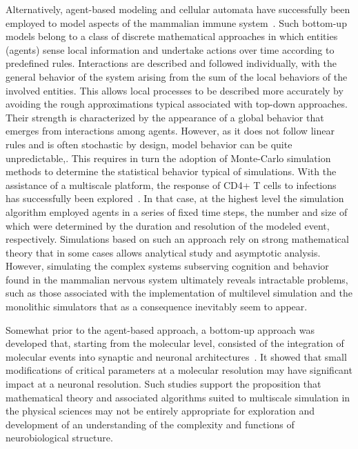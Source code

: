 \documentclass[11pt,3p,twocolumn]{JMN}
\begin{document}
Alternatively, agent-based modeling and cellular automata have successfully been employed to model aspects of the mammalian immune system~\citep{chiacchio14}. Such bottom-up models belong to a class of discrete mathematical approaches in which entities (agents) sense local information and undertake actions over time according to predefined rules. Interactions are described and followed individually, with the general behavior of the system arising from the sum of the local behaviors of the involved entities. This allows local processes to be described more accurately by avoiding the rough approximations typical associated with top-down approaches. Their strength is characterized by the appearance of a global behavior that emerges from interactions among agents. However, as it does not follow linear rules and is often stochastic by design, model behavior can be quite unpredictable,. This requires in turn the adoption of Monte-Carlo simulation methods to determine the statistical behavior typical of simulations. With the assistance of a multiscale platform, the response of CD4+ T cells to infections has successfully been explored~\citep{wertheim21}. In that case, at the highest level the simulation algorithm employed agents in a series of fixed time steps, the number and size of which were determined by the duration and resolution of the modeled event, respectively. Simulations based on such an approach rely on strong mathematical theory that in some cases allows analytical study and asymptotic analysis. However, simulating the complex systems subserving cognition and behavior found in the mammalian nervous system ultimately reveals intractable problems, such as those associated with the implementation of multilevel simulation and the monolithic simulators that as a consequence inevitably seem to appear.

Somewhat prior to the agent-based approach, a bottom-up approach was developed that, starting from the molecular level, consisted of the integration of molecular events into synaptic and neuronal architectures~\citep{bouteiller11}. It showed that small modifications of critical parameters at a molecular resolution may have significant impact at a neuronal resolution. Such studies support the proposition that mathematical theory and associated algorithms suited to multiscale simulation in the physical sciences may not be entirely appropriate for exploration and development of an understanding of the complexity and functions of neurobiological structure.
\end{document}
